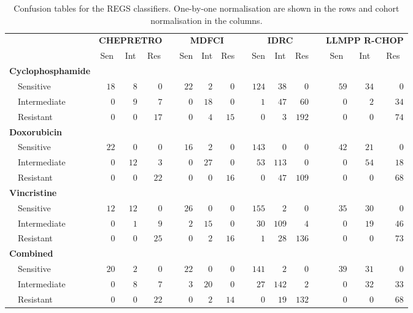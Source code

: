 \begin{table}[!tbp]
{\small
\caption{Confusion tables for the REGS classifiers.
One-by-one normalisation are shown in the rows and cohort normalisation in the
columns.\label{tab:confusiondrugreference}} 
\begin{center}
\begin{tabular}{lrrrcrrrcrrrcrrr}
\hline\hline
\multicolumn{1}{l}{\bfseries }&\multicolumn{3}{c}{\bfseries CHEPRETRO}&\multicolumn{1}{c}{\bfseries }&\multicolumn{3}{c}{\bfseries MDFCI}&\multicolumn{1}{c}{\bfseries }&\multicolumn{3}{c}{\bfseries IDRC}&\multicolumn{1}{c}{\bfseries }&\multicolumn{3}{c}{\bfseries LLMPP R-CHOP}\tabularnewline
\cline{2-4} \cline{6-8} \cline{10-12} \cline{14-16}
\multicolumn{1}{l}{}&\multicolumn{1}{c}{Sen}&\multicolumn{1}{c}{Int}&\multicolumn{1}{c}{Res}&\multicolumn{1}{c}{}&\multicolumn{1}{c}{Sen}&\multicolumn{1}{c}{Int}&\multicolumn{1}{c}{Res}&\multicolumn{1}{c}{}&\multicolumn{1}{c}{Sen}&\multicolumn{1}{c}{Int}&\multicolumn{1}{c}{Res}&\multicolumn{1}{c}{}&\multicolumn{1}{c}{Sen}&\multicolumn{1}{c}{Int}&\multicolumn{1}{c}{Res}\tabularnewline
\hline
{\bfseries Cyclophosphamide}&&&&&&&&&&&&&&&\tabularnewline
~~Sensitive&$18$&$ 8$&$ 0$&&$22$&$ 2$&$ 0$&&$124$&$ 38$&$  0$&&$59$&$34$&$ 0$\tabularnewline
~~Intermediate&$ 0$&$ 9$&$ 7$&&$ 0$&$18$&$ 0$&&$  1$&$ 47$&$ 60$&&$ 0$&$ 2$&$34$\tabularnewline
~~Resistant&$ 0$&$ 0$&$17$&&$ 0$&$ 4$&$15$&&$  0$&$  3$&$192$&&$ 0$&$ 0$&$74$\tabularnewline
\hline
{\bfseries Doxorubicin}&&&&&&&&&&&&&&&\tabularnewline
~~Sensitive&$22$&$ 0$&$ 0$&&$16$&$ 2$&$ 0$&&$143$&$  0$&$  0$&&$42$&$21$&$ 0$\tabularnewline
~~Intermediate&$ 0$&$12$&$ 3$&&$ 0$&$27$&$ 0$&&$ 53$&$113$&$  0$&&$ 0$&$54$&$18$\tabularnewline
~~Resistant&$ 0$&$ 0$&$22$&&$ 0$&$ 0$&$16$&&$  0$&$ 47$&$109$&&$ 0$&$ 0$&$68$\tabularnewline
\hline
{\bfseries Vincristine}&&&&&&&&&&&&&&&\tabularnewline
~~Sensitive&$12$&$12$&$ 0$&&$26$&$ 0$&$ 0$&&$155$&$  2$&$  0$&&$35$&$30$&$ 0$\tabularnewline
~~Intermediate&$ 0$&$ 1$&$ 9$&&$ 2$&$15$&$ 0$&&$ 30$&$109$&$  4$&&$ 0$&$19$&$46$\tabularnewline
~~Resistant&$ 0$&$ 0$&$25$&&$ 0$&$ 2$&$16$&&$  1$&$ 28$&$136$&&$ 0$&$ 0$&$73$\tabularnewline
\hline
{\bfseries Combined}&&&&&&&&&&&&&&&\tabularnewline
~~Sensitive&$20$&$ 2$&$ 0$&&$22$&$ 0$&$ 0$&&$141$&$  2$&$  0$&&$39$&$31$&$ 0$\tabularnewline
~~Intermediate&$ 0$&$ 8$&$ 7$&&$ 3$&$20$&$ 0$&&$ 27$&$142$&$  2$&&$ 0$&$32$&$33$\tabularnewline
~~Resistant&$ 0$&$ 0$&$22$&&$ 0$&$ 2$&$14$&&$  0$&$ 19$&$132$&&$ 0$&$ 0$&$68$\tabularnewline
\hline
\end{tabular}\end{center}}

\end{table}
